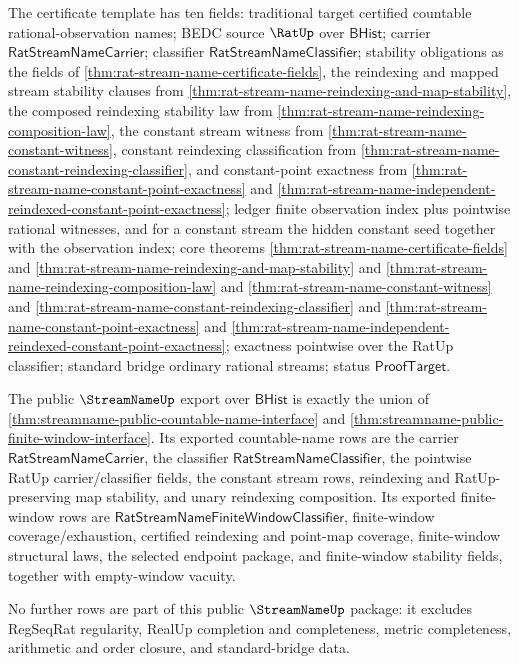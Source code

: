 The certificate template has ten fields: traditional target certified
countable rational-observation names; BEDC source $\RatUp$ over
$\mathsf{BHist}$; carrier $\mathsf{RatStreamNameCarrier}$; classifier
$\mathsf{RatStreamNameClassifier}$; stability obligations as the fields of
\autoref{thm:rat-stream-name-certificate-fields}, the reindexing and mapped
stream stability clauses from
\autoref{thm:rat-stream-name-reindexing-and-map-stability}, the composed
reindexing stability law from
\autoref{thm:rat-stream-name-reindexing-composition-law}, the constant stream
witness from \autoref{thm:rat-stream-name-constant-witness},
constant reindexing classification from
\autoref{thm:rat-stream-name-constant-reindexing-classifier}, and
constant-point exactness from
\autoref{thm:rat-stream-name-constant-point-exactness} and
\autoref{thm:rat-stream-name-independent-reindexed-constant-point-exactness};
ledger finite observation index plus pointwise rational witnesses, and for a
constant stream the hidden constant seed together with the observation index;
core theorems
\autoref{thm:rat-stream-name-certificate-fields} and
\autoref{thm:rat-stream-name-reindexing-and-map-stability} and
\autoref{thm:rat-stream-name-reindexing-composition-law} and
\autoref{thm:rat-stream-name-constant-witness} and
\autoref{thm:rat-stream-name-constant-reindexing-classifier} and
\autoref{thm:rat-stream-name-constant-point-exactness} and
\autoref{thm:rat-stream-name-independent-reindexed-constant-point-exactness};
exactness pointwise over the RatUp classifier; standard bridge ordinary
rational streams; status
$\mathsf{ProofTarget}$.

\begin{theorem}
\label{thm:streamname-public-interface-export-package}
The public $\StreamNameUp$ export over $\mathsf{BHist}$ is exactly the union of
\autoref{thm:streamname-public-countable-name-interface} and
\autoref{thm:streamname-public-finite-window-interface}.  Its exported
countable-name rows are the carrier $\mathsf{RatStreamNameCarrier}$, the
classifier $\mathsf{RatStreamNameClassifier}$, the pointwise RatUp
carrier/classifier fields, the constant stream rows, reindexing and
RatUp-preserving map stability, and unary reindexing composition.  Its
exported finite-window rows are
$\mathsf{RatStreamNameFiniteWindowClassifier}$, finite-window
coverage/exhaustion, certified reindexing and point-map coverage, finite-window
structural laws, the selected endpoint package, and finite-window stability
fields, together with empty-window vacuity.

No further rows are part of this public $\StreamNameUp$ package: it excludes
RegSeqRat regularity, RealUp completion and completeness, metric completeness,
arithmetic and order closure, and standard-bridge data.
\end{theorem}

